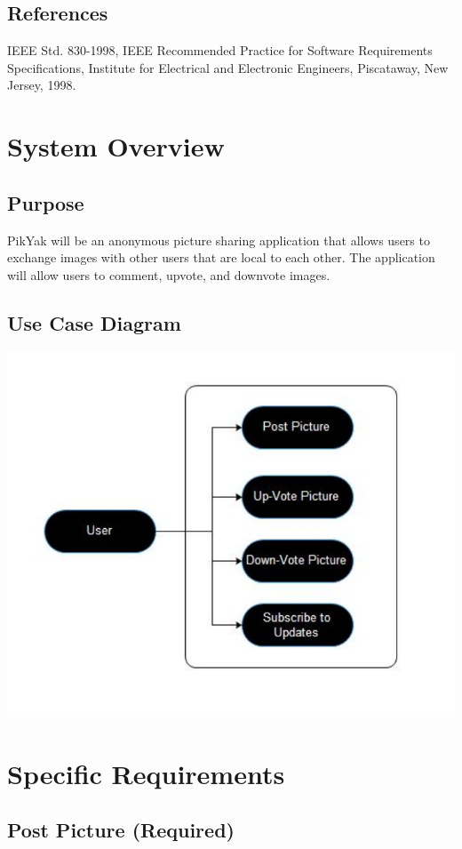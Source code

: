 \documentclass[11pt]{scrartcl}
\let\stdsection\section
\renewcommand\section{\newpage\stdsection}
\begin{document}
    \subsection{References}
        IEEE Std. 830-1998, IEEE Recommended Practice for Software Requirements Specifications, Institute for Electrical and Electronic Engineers, Piscataway, New Jersey, 1998.

\section{System Overview}
    \subsection{Purpose}
        PikYak will be an anonymous picture sharing application that allows users to exchange images with other users that are local to each other.  The application will allow users to comment, upvote, and downvote images.
    \subsection{Use Case Diagram}
        \includegraphics{useCase}

\section{Specific Requirements}
    \subsection{Post Picture (Required)}
    \label{sec:post}
\end{document}
